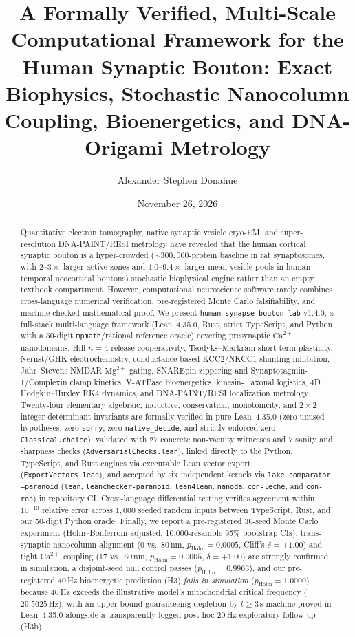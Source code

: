 \documentclass[11pt,letterpaper]{amsart}
\title[Formally Verified Human Synaptic Bouton Biophysics]{A Formally Verified, Multi-Scale Computational Framework for the Human Synaptic Bouton: Exact Biophysics, Stochastic Nanocolumn Coupling, Bioenergetics, and DNA-Origami Metrology}
\author{Alexander Stephen Donahue}
\date{November 26, 2026}
\begin{document}
\begin{abstract}
Quantitative electron tomography, native synaptic vesicle cryo-EM, and super-resolution DNA-PAINT/RESI metrology have revealed that the human cortical synaptic bouton is a hyper-crowded ($\sim 300{,}000$-protein baseline in rat synaptosomes, with $2\text{--}3\times$ larger active zones and $4.0\text{--}9.4\times$ larger mean vesicle pools in human temporal neocortical boutons) stochastic biophysical engine rather than an empty textbook compartment. However, computational neuroscience software rarely combines cross-language numerical verification, pre-registered Monte Carlo falsifiability, and machine-checked mathematical proof. We present \texttt{human-synapse-bouton-lab} v1.4.0, a full-stack multi-language framework (Lean~4.35.0, Rust, strict TypeScript, and Python with a 50-digit \texttt{mpmath}/rational reference oracle) covering presynaptic $\mathrm{Ca}^{2+}$ nanodomains, Hill $n=4$ release cooperativity, Tsodyks--Markram short-term plasticity, Nernst/GHK electrochemistry, conductance-based KCC2/NKCC1 shunting inhibition, Jahr--Stevens NMDAR $\mathrm{Mg}^{2+}$ gating, SNAREpin zippering and Synaptotagmin-1/Complexin clamp kinetics, V-ATPase bioenergetics, kinesin-1 axonal logistics, 4D Hodgkin--Huxley RK4 dynamics, and DNA-PAINT/RESI localization metrology. Twenty-four elementary algebraic, inductive, conservation, monotonicity, and $2\times 2$ integer determinant invariants are formally verified in pure Lean~4.35.0 (zero unused hypotheses, zero \texttt{sorry}, zero \texttt{native\_decide}, and strictly enforced zero \texttt{Classical.choice}), validated with 27 concrete non-vacuity witnesses and 7 sanity and sharpness checks (\texttt{AdversarialChecks.lean}), linked directly to the Python, TypeScript, and Rust engines via executable Lean vector export (\texttt{ExportVectors.lean}), and accepted by six independent kernels via \texttt{lake comparator --paranoid} (\texttt{lean}, \texttt{leanchecker-paranoid}, \texttt{lean4lean}, \texttt{nanoda}, \texttt{con-leche}, and \texttt{con-ron}) in repository CI. Cross-language differential testing verifies agreement within $10^{-10}$ relative error across $1{,}000$ seeded random inputs between TypeScript, Rust, and our 50-digit Python oracle. Finally, we report a pre-registered 30-seed Monte Carlo experiment (Holm--Bonferroni adjusted, 10,000-resample 95\% bootstrap CIs): trans-synaptic nanocolumn alignment ($0$ vs.\ $80\,$nm, $p_{\mathrm{Holm}}=0.0005$, Cliff's $\delta=+1.00$) and tight $\mathrm{Ca}^{2+}$ coupling ($17$ vs.\ $60\,$nm, $p_{\mathrm{Holm}}=0.0005$, $\delta=+1.00$) are strongly confirmed in simulation, a disjoint-seed null control passes ($p_{\mathrm{Holm}}=0.9963$), and our pre-registered 40\,Hz bioenergetic prediction (H3) \emph{fails in simulation} ($p_{\mathrm{Holm}}=1.0000$) because 40\,Hz exceeds the illustrative model's mitochondrial critical frequency ($29.5625\,$Hz), with an upper bound guaranteeing depletion by $t \ge 3\,$s machine-proved in Lean~4.35.0 alongside a transparently logged post-hoc 20\,Hz exploratory follow-up (H3b).
\end{abstract}
\end{document}

